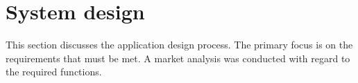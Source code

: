 \section{System design}
This section discusses the application design process. The primary focus is on the requirements that must be met. A market analysis was conducted with regard to the required functions.















\newpage


